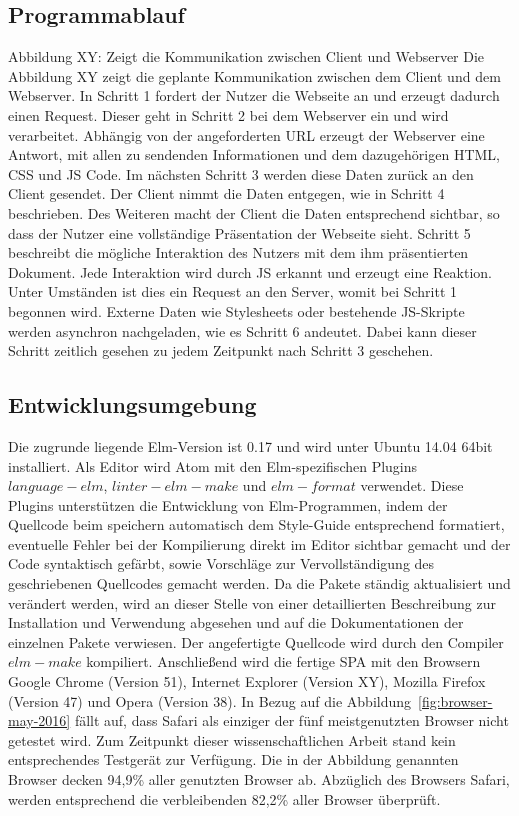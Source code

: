 \subsection{Programmablauf}
\label{sec:Programmablauf}
Abbildung XY: Zeigt die Kommunikation zwischen Client und Webserver
Die Abbildung XY zeigt die geplante Kommunikation zwischen dem Client und dem Webserver.
In Schritt 1 fordert der Nutzer die Webseite an und erzeugt dadurch einen Request. Dieser geht in Schritt 2 bei dem Webserver ein und wird verarbeitet. Abhängig von der angeforderten URL erzeugt der Webserver eine Antwort, mit allen zu sendenden Informationen und dem dazugehörigen \ac{HTML}, \ac{CSS} und \ac{JS} Code. Im nächsten Schritt 3 werden diese Daten zurück an den Client gesendet. Der Client nimmt die Daten entgegen, wie in Schritt 4 beschrieben. Des Weiteren macht der Client die Daten entsprechend sichtbar, so dass der Nutzer eine vollständige Präsentation der Webseite sieht. Schritt 5 beschreibt die mögliche Interaktion des Nutzers mit dem ihm präsentierten Dokument. Jede Interaktion wird durch \ac{JS} erkannt und erzeugt eine Reaktion. Unter Umständen ist dies ein Request an den Server, womit bei Schritt 1 begonnen wird. Externe Daten wie Stylesheets oder bestehende \ac{JS}-Skripte  werden asynchron nachgeladen, wie es Schritt 6 andeutet. Dabei kann dieser Schritt zeitlich gesehen zu jedem Zeitpunkt nach Schritt 3 geschehen.


\subsection{Entwicklungsumgebung}
\label{sec:Entwicklungsumgebung}
Die zugrunde liegende Elm-Version ist 0.17 und wird unter Ubuntu 14.04 64bit installiert. Als Editor wird Atom mit den Elm-spezifischen Plugins $language-elm$, $linter-elm-make$ und $elm-format$ verwendet. Diese Plugins unterstützen die Entwicklung von Elm-Programmen, indem der Quellcode beim speichern automatisch dem Style-Guide entsprechend formatiert, eventuelle Fehler bei der Kompilierung direkt im Editor sichtbar gemacht und der Code syntaktisch gefärbt, sowie Vorschläge zur Vervollständigung des geschriebenen Quellcodes gemacht werden. Da die Pakete ständig aktualisiert und verändert werden, wird an dieser Stelle von einer detaillierten Beschreibung zur Installation und Verwendung abgesehen und auf die Dokumentationen der einzelnen Pakete verwiesen.
Der angefertigte Quellcode wird durch den Compiler $elm-make$ kompiliert.
Anschließend wird die fertige \ac{SPA} mit den Browsern Google Chrome (Version 51), Internet Explorer (Version XY), Mozilla Firefox (Version 47) und Opera (Version 38). In Bezug auf die Abbildung~\ref{fig:browser-may-2016} fällt auf, dass Safari als einziger der fünf meistgenutzten Browser nicht getestet wird. Zum Zeitpunkt dieser wissenschaftlichen Arbeit stand kein entsprechendes Testgerät zur Verfügung. Die in der Abbildung genannten Browser decken 94,9\% aller genutzten Browser ab. Abzüglich des Browsers Safari, werden entsprechend die verbleibenden 82,2\% aller Browser überprüft.


